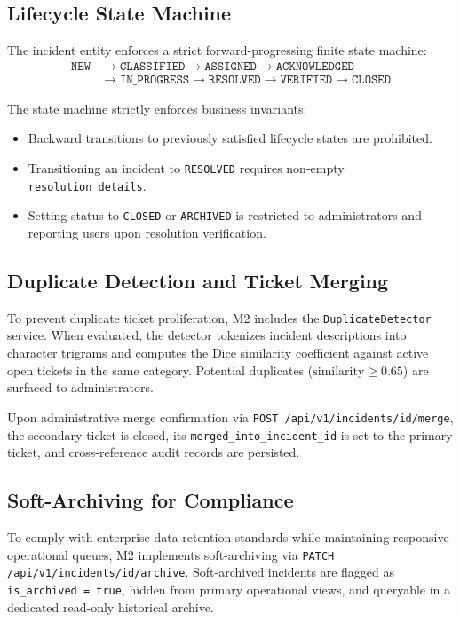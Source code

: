 \documentclass[11pt,a4paper,oneside]{report}
\begin{document}
\subsection{Lifecycle State Machine}
The incident entity enforces a strict forward-progressing finite state machine:
\begin{equation}
\begin{aligned}
    \texttt{NEW} &\longrightarrow \texttt{CLASSIFIED} \longrightarrow \texttt{ASSIGNED} \longrightarrow \texttt{ACKNOWLEDGED} \\
    &\longrightarrow \texttt{IN\_PROGRESS} \longrightarrow \texttt{RESOLVED} \longrightarrow \texttt{VERIFIED} \longrightarrow \texttt{CLOSED}
\end{aligned}
\end{equation}

The state machine strictly enforces business invariants:
\begin{itemize}
    \item Backward transitions to previously satisfied lifecycle states are prohibited.
    \item Transitioning an incident to \texttt{RESOLVED} requires non-empty \texttt{resolution\_details}.
    \item Setting status to \texttt{CLOSED} or \texttt{ARCHIVED} is restricted to administrators and reporting users upon resolution verification.
\end{itemize}

\subsection{Duplicate Detection and Ticket Merging}
To prevent duplicate ticket proliferation, M2 includes the \texttt{DuplicateDetector} service. When evaluated, the detector tokenizes incident descriptions into character trigrams and computes the Dice similarity coefficient against active open tickets in the same category. Potential duplicates ($\text{similarity} \ge 0.65$) are surfaced to administrators. 

Upon administrative merge confirmation via \texttt{POST /api/v1/incidents/{id}/merge}, the secondary ticket is closed, its \texttt{merged\_into\_incident\_id} is set to the primary ticket, and cross-reference audit records are persisted.

\subsection{Soft-Archiving for Compliance}
To comply with enterprise data retention standards while maintaining responsive operational queues, M2 implements soft-archiving via \texttt{PATCH /api/v1/incidents/{id}/archive}. Soft-archived incidents are flagged as \texttt{is\_archived = true}, hidden from primary operational views, and queryable in a dedicated read-only historical archive.
\end{document}
